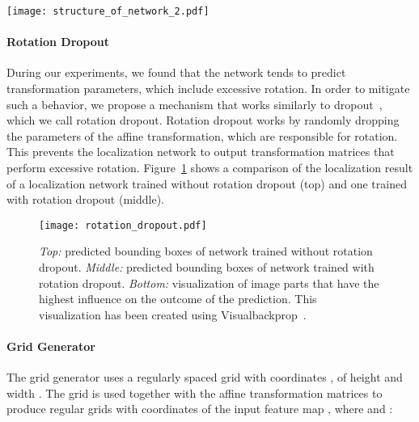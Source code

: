 \documentclass[letterpaper]{article}
\begin{document}
	\begin{figure*}[t]
		\centering
		\texttt{[image: structure\_of\_network\_2.pdf]}
		\caption{The network used in our work consists of two major parts. The first is the localization network that takes the input image and predicts  transformation matrices, which are used to create  different sampling grids. The generated sampling grids are used in two ways:
		(1) for calculating the bounding boxes of the identified text regions
		(2) for extracting  text regions.
		The recognition network then performs text recognition on these extracted regions.
		The whole system is trained end-to-end by only supplying information about the text labels for each text region.}
		\label{fig:localization_net_structure}
	\end{figure*}

	\paragraph{Rotation Dropout}
		During our experiments, we found that the network tends to predict transformation parameters, which include excessive rotation.
		In order to mitigate such a behavior, we propose a mechanism that works similarly to dropout~\cite{Srivastava2014Dropout}, which we call rotation dropout.
		Rotation dropout works by randomly dropping the parameters of the affine transformation, which are responsible for rotation.
		This prevents the localization network to output transformation matrices that perform excessive rotation.
		Figure~\ref{fig:rotation_dropout_visualization} shows a comparison of the localization result of a localization network trained without rotation dropout (top) and one trained with rotation dropout (middle).

	\begin{figure}[t]
		\centering
		\texttt{[image: rotation\_dropout.pdf]}
		\caption{\emph{Top:} predicted bounding boxes of network trained without rotation dropout. \emph{Middle:} predicted bounding boxes of network trained with rotation dropout. \emph{Bottom:} visualization of image parts that have the highest influence on the outcome of the prediction. This visualization has been created using Visualbackprop~\cite{Bojarski2016Visualbackprop}.}
		\label{fig:rotation_dropout_visualization}
	\end{figure}

	\paragraph{Grid Generator}
		The grid generator uses a regularly spaced grid  with coordinates , of height  and width . The grid  is used together with the affine transformation matrices  to produce  regular grids  with coordinates  of the input feature map , where  and :
		
\end{document}
